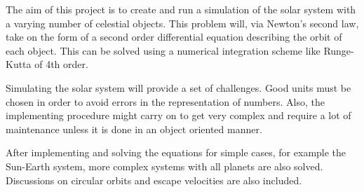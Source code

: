The aim of this project is to create and run a simulation of the
solar system with a varying number of celestial objects. This
problem will, via Newton's second law, take on the form of a second
order differential equation describing the orbit of each object.
This can be solved using a numerical integration scheme like
Runge-Kutta of 4th order.

Simulating the solar system will provide a set of challenges. Good
units must be chosen in order to avoid errors in the representation
of numbers. Also, the implementing procedure might carry on to get
very complex and require a lot of maintenance unless it is done in
an object oriented manner.

After implementing and solving the equations for simple cases, for
example the Sun-Earth system, more complex systems with all planets
are also solved. Discussions on circular orbits and escape
velocities are also included.
